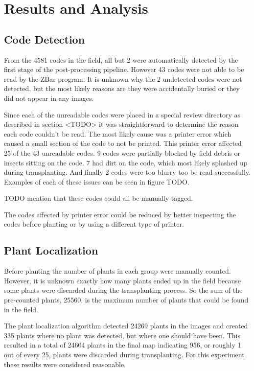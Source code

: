 
\cleardoublepage

\chapter{Results and Analysis}
\label{processing}

\section{Code Detection}

From the 4581 codes in the field, all but 2 were automatically detected by the first stage of the post-processing pipeline.  However 43 codes were not able to be read by the ZBar program.  It is unknown why the 2 undetected codes were not detected, but the most likely reasons are they were accidentally buried or they did not appear in any images.  

Since each of the unreadable codes were placed in a special review directory as described in section <TODO> it was straightforward to determine the reason each code couldn't be read.  The most likely cause was a printer error which caused a small section of the code to not be printed.  This printer error affected 25 of the 43 unreadable codes.  9 codes were partially blocked by field debris or insects sitting on the code.  7 had dirt on the code, which most likely splashed up during transplanting. And finally 2 codes were too blurry too be read successfully.  Examples of each of these issues can be seen in figure TODO. 

TODO mention that these codes could all be manually tagged.

The codes affected by printer error could be reduced by better inspecting the codes before planting or by using a different type of printer.


\section{Plant Localization}
\label{section:plant_localization}

Before planting the number of plants in each group were manually counted. However, it is unknown exactly how many plants ended up in the field because some plants were discarded during the transplanting process.  So the sum of the pre-counted plants, 25560, is the maximum number of plants that could be found in the field.  

The plant localization algorithm detected 24269 plants in the images and created 335 plants where no plant was detected, but where one should have been.  This resulted in a total of 24604 plants in the final map indicating 956, or roughly 1 out of every 25, plants were discarded during transplanting.  For this experiment these results were considered reasonable. 

